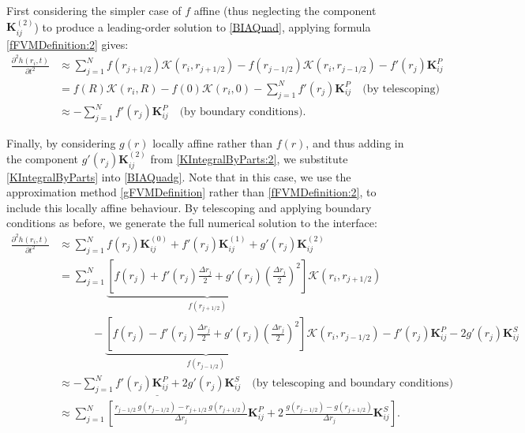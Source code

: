 \documentclass[11pt,a4paper]{article}
\begin{document}
	First considering the simpler case of $f$ affine (thus neglecting the component $\mathbf{K}^{(2)}_{ij}$) to produce a leading-order solution to \eqref{BIAQuad}, applying formula \eqref{fFVMDefinition:2} gives:
	\begin{equation}
		\label{BIAQuad2}
		\begin{aligned}
			\frac{\partial^2 h(r_i,t)}{\partial t^2} &\approx \sum^N_{j = 1} f(r_{j+1/2})\mathcal{K}(r_i, r_{j+1/2}) - f(r_{j-1/2})\mathcal{K}(r_i, r_{j-1/2}) - f'(r_j)\mathbf{K}^P_{ij} \\
			&= f(R)\mathcal{K}(r_i, R) - f(0)\mathcal{K}(r_i, 0) - \sum^N_{j = 1} f'(r_j)\mathbf{K}^P_{ij} \quad \text{(by telescoping)} \\
			&\approx -\sum^N_{j = 1} f'(r_j) \mathbf{K}^P_{ij}\quad \text{(by boundary conditions)}.
		\end{aligned}
	\end{equation}
	
	Finally, by considering $g(r)$ locally affine rather than $f(r)$, and thus adding in the component $g'(r_j)\mathbf{K}^{(2)}_{ij}$ from \eqref{KIntegralByParts:2}, we substitute \eqref{KIntegralByParts} into \eqref{BIAQuadg}. Note that in this case, we use the approximation method \eqref{gFVMDefinition} rather than \eqref{fFVMDefinition:2}, to include this locally affine behaviour. By telescoping and applying boundary conditions as before, we generate the full numerical solution to the interface:
	\begin{equation}
		\label{BIAQuadFull}
		\begin{aligned}
			\frac{\partial^2 h(r_i,t)}{\partial t^2} &\approx \sum^N_{j = 1} f(r_j)\mathbf{K}^{(0)}_{ij} + f'(r_j)\mathbf{K}^{(1)}_{ij} + g'(r_j)\mathbf{K}^{(2)}_{ij} \\
			&= \sum^N_{j = 1} \underbrace{\left[f(r_j) + f'(r_j)\frac{\Delta r_j}{2} + g'(r_j)\left(\frac{\Delta r_j}{2}\right)^2\right]}_{f(r_{j+1/2})}\mathcal{K}(r_i, r_{j+1/2}) \\
			&\qquad\quad - \underbrace{\left[f(r_j) - f'(r_j)\frac{\Delta r_j}{2} + g'(r_j)\left(\frac{\Delta r_j}{2}\right)^2\right]}_{f(r_{j-1/2})}\mathcal{K}(r_i, r_{j-1/2}) - f'(r_j)\mathbf{K}^P_{ij} - 2g'(r_j)\mathbf{K}^S_{ij} \\
			&\approx \underline{-\sum^N_{j = 1} f'(r_j)\mathbf{K}^P_{ij} + 2g'(r_j)\mathbf{K}^S_{ij}} \quad \text{(by telescoping and boundary conditions)} \\[6pt]
			&\approx \sum_{j=1}^N \left[ \frac{r_{j-1/2}\ g(r_{j-1/2}) - r_{j+1/2}\ g(r_{j+1/2})}{\Delta r_j} \mathbf{K}^P_{ij} + 2\,\frac{g(r_{j-1/2}) - g(r_{j+1/2})}{\Delta r_j} \mathbf{K}^S_{ij} \right].
		\end{aligned}
	\end{equation}
	
\end{document}
